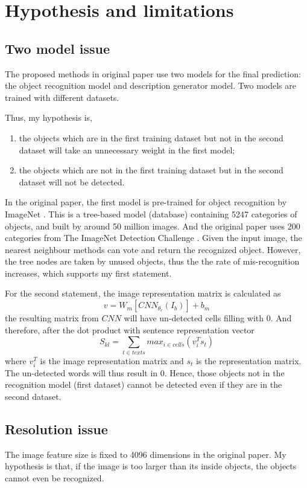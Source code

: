 \documentclass[10pt,twocolumn,letterpaper]{article}
\begin{document}
\section{Hypothesis and limitations}
\subsection{Two model issue}
The proposed methods in original paper use two models for the final prediction:
the object recognition model and description generator model.
Two models are trained with different datasets.

Thus, my hypothesis is,
\begin{enumerate}
    \item the objects which are in the first training dataset but not in the second dataset
          will take an unnecessary weight in the first model;
    \item the objects which are not in the first training dataset but in the second dataset
          will not be detected.
\end{enumerate}

In the original paper, the first model is pre-trained for object recognition by ImageNet \cite{imagenet}.
This is a tree-based model (database) containing 5247 categories of objects, and built by around 50 million images.
And the original paper uses 200 categories from The ImageNet Detection Challenge \cite{inch}.
Given the input image, the nearest neighbour methods can vote and return the recognized object.
However, the tree nodes are taken by unused objects, thus the the rate of mis-recognition increases, which supports my first statement.

For the second statement, the image representation matrix is calculated as
$$v = W_{m} \left [ CNN_{\theta_{c}}(I_{b}) \right ] + b_{m}$$
the resulting matrix from $CNN$ will have un-detected cells filling with $0$.
And therefore, after the dot product with sentence representation vector
$$S_{kl} = \sum_{t \in texts} max_{i \in cells}(v_{i}^{T}s_{t})$$
where $v_{i}^{T}$ is the image representation matrix and $s_{t}$ is the representation matrix.
The un-detected words will thus result in $0$.
Hence, those objects not in the recognition model (first dataset) cannot be detected even if they are in the second dataset.


\subsection{Resolution issue}
The image feature size is fixed to 4096 dimensions in the original paper.
My hypothesis is that, if the image is too larger than its inside objects, the objects cannot even be recognized.
\end{document}
